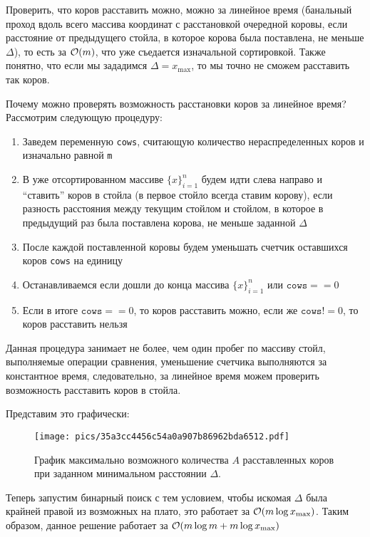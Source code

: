\begin{solution}
Проверить, что коров расставить можно, можно за линейное время (банальный проход вдоль всего массива координат с расстановкой очередной коровы, если расстояние от предыдущего стойла, в которое корова была поставлена, не меньше $\Delta$), то есть за $\mathcal{O}(m)$, что уже съедается изначальной сортировкой. Также понятно, что если мы зададимся $\Delta = x_{\text{max}}$, то мы точно не сможем расставить так коров.
\begin{remark}
    Почему можно проверять возможность расстановки коров за линейное время?
    Рассмотрим следующую процедуру:
    \begin{enumerate}[1)]
        \item Заведем переменную \texttt{cows}, считающую количество нераспределенных коров и изначально равной \texttt{m}
        \item В уже отсортированном массиве $\{x\}^{n}_{i=1}$ будем идти слева направо и ``ставить'' коров в стойла (в первое стойло всегда ставим корову), если разность расстояния между текущим стойлом и стойлом, в которое в предыдущий раз была поставлена корова, не меньше заданной $\Delta$
        \item После каждой поставленной коровы будем уменьшать счетчик оставшихся коров \texttt{cows} на единицу
        \item Останавливаемся если дошли до конца массива $\{x\}^{n}_{i=1}$ или $\texttt{cows} == 0$
        \item Если в итоге $\texttt{cows} == 0$, то коров расставить можно, если же $\texttt{cows} != 0$, то коров расставить нельзя
    \end{enumerate}
    Данная процедура занимает не более, чем один пробег по массиву стойл, выполняемые операции сравнения, уменьшение счетчика выполняются за константное время, следовательно, за линейное время можем проверить возможность расставить коров в стойла.
\end{remark}
Представим это графически:
\begin{figure}[H]
    \centering
    \texttt{[image: pics/35a3cc4456c54a0a907b86962bda6512.pdf]}
    \caption{График максимально возможного количества $A$ расставленных коров при заданном минимальном расстоянии $\Delta$.}
\end{figure}
Теперь запустим бинарный поиск с тем условием, чтобы искомая $\Delta$ была крайней правой из возможных на плато, это работает за $\mathcal{O}(m\log x_{\text{max}})$. Таким образом, данное решение работает за $\mathcal{O}(m\log m + m\log x_{\text{max}})$
\end{solution}